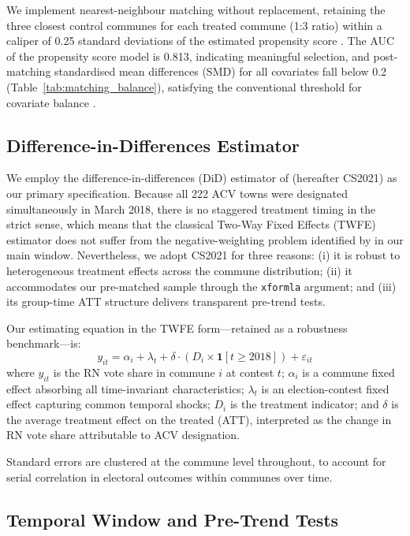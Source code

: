 We implement nearest-neighbour matching without replacement, retaining the three closest control communes for each treated commune (1:3 ratio) within a caliper of 0.25 standard deviations of the estimated propensity score \citep{Austin2011}. The AUC of the propensity score model is 0.813, indicating meaningful selection, and post-matching standardised mean differences (SMD) for all covariates fall below 0.2 (Table~\ref{tab:matching_balance}), satisfying the conventional threshold for covariate balance \citep{Stuart2010}.

\subsection{Difference-in-Differences Estimator}

We employ the difference-in-differences (DiD) estimator of \citet{Callaway2021} (hereafter CS2021) as our primary specification. Because all 222 ACV towns were designated simultaneously in March 2018, there is no staggered treatment timing in the strict sense, which means that the classical Two-Way Fixed Effects (TWFE) estimator does not suffer from the negative-weighting problem identified by \citet{Goodman-Bacon2021} in our main window. Nevertheless, we adopt CS2021 for three reasons: (i) it is robust to heterogeneous treatment effects across the commune distribution; (ii) it accommodates our pre-matched sample through the \texttt{xformla} argument; and (iii) its group-time ATT structure delivers transparent pre-trend tests.

Our estimating equation in the TWFE form---retained as a robustness benchmark---is:
\begin{equation}
  y_{it} = \alpha_i + \lambda_t + \delta \cdot (D_i \times \mathbf{1}[t \geq 2018]) + \varepsilon_{it}
  \label{eq:twfe}
\end{equation}
where $y_{it}$ is the RN vote share in commune $i$ at contest $t$; $\alpha_i$ is a commune fixed effect absorbing all time-invariant characteristics; $\lambda_t$ is an election-contest fixed effect capturing common temporal shocks; $D_i$ is the treatment indicator; and $\delta$ is the average treatment effect on the treated (ATT), interpreted as the change in RN vote share attributable to ACV designation.

Standard errors are clustered at the commune level throughout, to account for serial correlation in electoral outcomes within communes over time.

\subsection{Temporal Window and Pre-Trend Tests}

